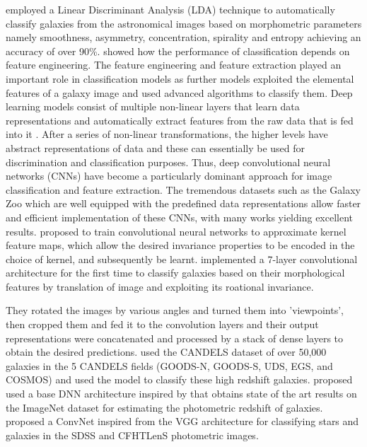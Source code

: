 \documentclass[fleqn,usenatbib]{mnras}
\begin{document}
\hspace*{0.25 in}\citet{Ferrari_2015} employed a Linear Discriminant Analysis (LDA) technique to automatically classify galaxies from the astronomical images based on morphometric parameters namely smoothness, asymmetry, concentration, spirality and entropy achieving an accuracy of over 90\%.
\citet{Lecun2015} showed how the performance of classification depends on feature engineering. The feature engineering and feature extraction played an important role in classification models as further models exploited the elemental features of a galaxy image and used advanced algorithms to classify them. Deep learning models consist of multiple non-linear layers that learn data representations and automatically extract features from the raw data that is fed into it \citep{Bengio2013,Lecun2015}. After a series of non-linear transformations, the higher levels have abstract representations of data and these can essentially be used for discrimination and classification purposes. Thus, deep convolutional neural networks (CNNs) have become a particularly dominant approach for image classification and feature extraction. The tremendous datasets such as the Galaxy Zoo which are well equipped with the predefined data representations allow faster and efficient implementation of these CNNs, with many works yielding excellent results. \citet{Mairal2014} proposed to train convolutional neural networks to approximate kernel feature maps, which allow the desired invariance properties to be encoded in the choice of kernel, and subsequently be learnt. \citet{Dieleman2015} implemented a 7-layer convolutional architecture for the first time to classify galaxies based on their morphological features by translation of image and exploiting its roational invariance.

They rotated the images by various angles and turned them into 'viewpoints', then cropped them and fed it to the convolution layers and their output representations were concatenated and processed by a stack of dense layers to obtain the desired predictions. \citet{Huertas} used the CANDELS dataset of over 50,000 galaxies in the 5 CANDELS fields (GOODS-N, GOODS-S, UDS, EGS, and COSMOS) and used the \citep{Dieleman2015} model to classify these high redshift galaxies. \citet{HOYLE} proposed used a base DNN architecture inspired by \citet{Krizhevsky} that obtains state of the art results on the ImageNet dataset for estimating the photometric redshift of galaxies. \citet{brunner} proposed a ConvNet inspired from the VGG architecture for classifying stars and galaxies in the SDSS and CFHTLenS photometric images.
\end{document}
